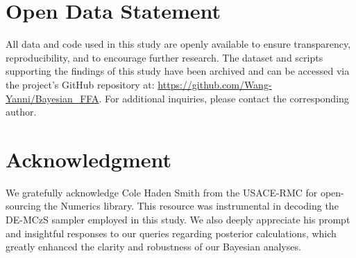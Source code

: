 \section*{Open Data Statement}
All data and code used in this study are openly available to ensure transparency, reproducibility, and to encourage further research. The dataset and scripts supporting the findings of this study have been archived and can be accessed via the project's GitHub repository at: \href{https://github.com/Wang-Yanni/Bayesian_FFA}{https://github.com/Wang-Yanni/Bayesian\_FFA}. For additional inquiries, please contact the corresponding author.


\section*{Acknowledgment}
We gratefully acknowledge Cole Haden Smith from the USACE-RMC for open-sourcing the Numerics library. This resource was instrumental in decoding the DE-MCzS sampler employed in this study. We also deeply appreciate his prompt and insightful responses to our queries regarding posterior calculations, which greatly enhanced the clarity and robustness of our Bayesian analyses. 
